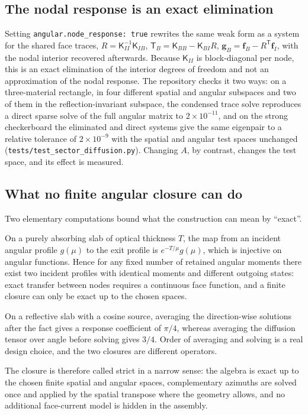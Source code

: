 \documentclass[11pt,a4paper]{article}
\begin{document}
\subsection{The nodal response is an exact elimination}
Setting \texttt{angular.node\_response: true} rewrites the same weak form as a system
for the shared face traces,
$R=\mathsf{K}_{II}^{-1}\mathsf{K}_{IB}$,
$\mathsf{T}_B=\mathsf{K}_{BB}-\mathsf{K}_{BI}R$,
$\mathbf{g}_B=\mathbf{f}_B-R^{\mathsf T}\mathbf{f}_I$, with the nodal interior
recovered afterwards. Because $\mathsf{K}_{II}$ is block-diagonal per node, this is an
exact elimination of the interior degrees of freedom and not an approximation of the
nodal response. The repository checks it two ways: on a three-material rectangle, in four
different spatial and angular subspaces and two of them in the reflection-invariant
subspace, the condensed trace solve reproduces a direct sparse solve of the full
angular matrix to $2\times10^{-11}$, and on the strong checkerboard the eliminated and
direct systems
give the same eigenpair to a relative tolerance of $2\times10^{-9}$ with the spatial
and angular test spaces unchanged (\texttt{tests/test\_sector\_diffusion.py}).
Changing $A$, by contrast, changes the test space, and its effect is measured.

\subsection{What no finite angular closure can do}
Two elementary computations bound what the construction can mean by ``exact''.

On a purely absorbing slab of optical thickness $T$, the map from an incident
angular profile $g(\mu)$ to the exit profile is $e^{-T/\mu}g(\mu)$, which is
injective on angular functions. Hence for any fixed number of retained angular
moments there exist two incident profiles with identical moments and different
outgoing states: exact transfer between nodes requires a continuous face function,
and a finite closure can only be exact up to the chosen spaces.

On a reflective slab with a cosine source, averaging the direction-wise solutions
after the fact gives a response coefficient of $\pi/4$, whereas averaging the
diffusion tensor over angle before solving gives $3/4$. Order of averaging and
solving is a real design choice, and the two closures are different operators.

The closure is therefore called strict in a narrow sense: the algebra is exact up to
the chosen finite spatial and angular spaces, complementary azimuths are solved once
and applied by the spatial transpose where the geometry allows, and no additional
face-current model is hidden in the assembly.
\end{document}

